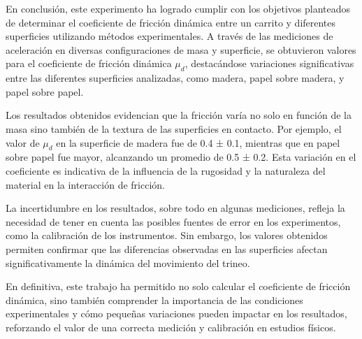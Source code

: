 \documentclass[12pt,a4]{article}
\begin{document}
En conclusión, este experimento ha logrado cumplir con los objetivos planteados de determinar el coeficiente de fricción dinámica entre un carrito y diferentes superficies utilizando métodos experimentales. A través de las mediciones de aceleración en diversas configuraciones de masa y superficie, se obtuvieron valores para el coeficiente de fricción dinámica $\mu_d$, destacándose variaciones significativas entre las diferentes superficies analizadas, como madera, papel sobre madera, y papel sobre papel.

Los resultados obtenidos evidencian que la fricción varía no solo en función de la masa sino también de la textura de las superficies en contacto. Por ejemplo, el valor de $\mu_d$ en la superficie de madera fue de 0.4 ± 0.1, mientras que en papel sobre papel fue mayor, alcanzando un promedio de 0.5 ± 0.2. Esta variación en el coeficiente es indicativa de la influencia de la rugosidad y la naturaleza del material en la interacción de fricción.

La incertidumbre en los resultados, sobre todo en algunas mediciones, refleja la necesidad de tener en cuenta las posibles fuentes de error en los experimentos, como la calibración de los instrumentos. Sin embargo, los valores obtenidos permiten confirmar que las diferencias observadas en las superficies afectan significativamente la dinámica del movimiento del trineo.

En definitiva, este trabajo ha permitido no solo calcular el coeficiente de fricción dinámica, sino también comprender la importancia de las condiciones experimentales y cómo pequeñas variaciones pueden impactar en los resultados, reforzando el valor de una correcta medición y calibración en estudios físicos.
\end{document}
